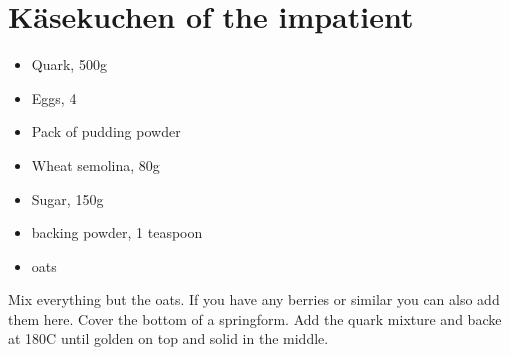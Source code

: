 \section{Käsekuchen of the impatient}{

        \begin{itemize}
                \item Quark, 500g
                \item Eggs, 4
                \item Pack of pudding powder 
                \item Wheat semolina, 80g
                \item Sugar, 150g
                \item backing powder, 1 teaspoon
                \item oats
        \end{itemize}

        Mix everything but the oats. If you have any berries
        or similar you can also add them here. 
        Cover the bottom of a springform. 
        Add the quark mixture and backe at 180C until golden on
        top and solid in the middle.

        }

